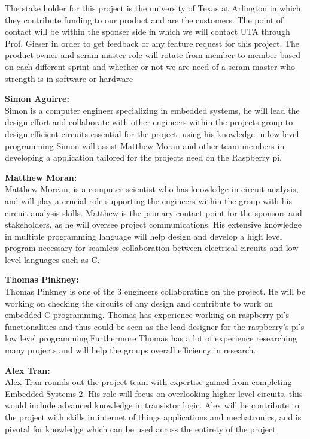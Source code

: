 The stake holder for this project is the university of Texas at Arlington in which they contribute funding to our product and are the customers. The point of contact will be within the sponser side in which we will contact UTA through Prof. Gieser in order to get feedback or any feature request for this project. The product owner and scram master role will rotate from member to member based on each different sprint and whether or not we are need of a scram master who strength is in software or hardware

\textbf{Simon Aguirre:} \\
Simon is a computer engineer specializing in embedded systems, he will lead the design effort and collaborate with other engineers within the projects group to design efficient circuits essential for the project. using his knowledge in low level programming Simon will assist Matthew Moran and other team members in developing a application tailored for the projects need on the Raspberry pi.


\textbf{Matthew Moran:} \\
Matthew Morean, is a computer scientist who has knowledge in circuit analysis, and will play a crucial role supporting the engineers within the group with his circuit analysis skills. Matthew is the primary contact point for the sponsors and stakeholders, as he will oversee project communications. His extensive knowledge in multiple programming language will help design and develop a high level program necessary for seamless collaboration between electrical circuits and low level languages such as C.


\textbf{Thomas Pinkney:} \\
Thomas Pinkney is one of the 3 engineers collaborating on the project. He will be working on checking the circuits of any design and contribute to work on embedded C programming. Thomas has experience working on raspberry pi's functionalities and thus could be seen as the lead designer for the raspberry's pi's low level programming.Furthermore Thomas has a lot of experience researching many projects and will help the groups overall efficiency in research.

\textbf{Alex Tran:} \\
Alex Tran rounds out the project team with expertise gained from completing Embedded Systems 2. His role will focus on overlooking higher level circuits, this would include advanced knowledge in transistor logic. Alex will be contribute to the project with skills in internet of things applications and mechatronics, and is pivotal for knowledge which can be used across the entirety of the project




